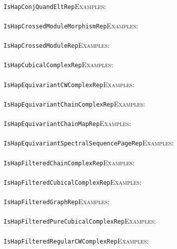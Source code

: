 \documentclass[a4paper,11pt]{report}
\begin{document}
{{ \\
 \texttt{IsHapConjQuandEltRep}{\nobreakspace}{\nobreakspace}{\nobreakspace}{\nobreakspace}\textsc{Examples:} \\
 \\
 \texttt{IsHapCrossedModuleMorphismRep}{\nobreakspace}{\nobreakspace}{\nobreakspace}{\nobreakspace}\textsc{Examples:} \\
 \\
 \texttt{IsHapCrossedModuleRep}{\nobreakspace}{\nobreakspace}{\nobreakspace}{\nobreakspace}\textsc{Examples:} \\
 \\
 \texttt{IsHapCubicalComplexRep}{\nobreakspace}{\nobreakspace}{\nobreakspace}{\nobreakspace}\textsc{Examples:} \\
 \\
 \texttt{IsHapEquivariantCWComplexRep}{\nobreakspace}{\nobreakspace}{\nobreakspace}{\nobreakspace}\textsc{Examples:} \\
 \\
 \texttt{IsHapEquivariantChainComplexRep}{\nobreakspace}{\nobreakspace}{\nobreakspace}{\nobreakspace}\textsc{Examples:} \\
 \\
 \texttt{IsHapEquivariantChainMapRep}{\nobreakspace}{\nobreakspace}{\nobreakspace}{\nobreakspace}\textsc{Examples:} \\
 \\
 \texttt{IsHapEquivariantSpectralSequencePageRep}{\nobreakspace}{\nobreakspace}{\nobreakspace}{\nobreakspace}\textsc{Examples:} \\
 \\
 \texttt{IsHapFilteredChainComplexRep}{\nobreakspace}{\nobreakspace}{\nobreakspace}{\nobreakspace}\textsc{Examples:} \\
 \\
 \texttt{IsHapFilteredCubicalComplexRep}{\nobreakspace}{\nobreakspace}{\nobreakspace}{\nobreakspace}\textsc{Examples:} \\
 \\
 \texttt{IsHapFilteredGraphRep}{\nobreakspace}{\nobreakspace}{\nobreakspace}{\nobreakspace}\textsc{Examples:} \\
 \\
 \texttt{IsHapFilteredPureCubicalComplexRep}{\nobreakspace}{\nobreakspace}{\nobreakspace}{\nobreakspace}\textsc{Examples:} \\
 \\
 \texttt{IsHapFilteredRegularCWComplexRep}{\nobreakspace}{\nobreakspace}{\nobreakspace}{\nobreakspace}\textsc{Examples:} \\
}}
\end{document}
